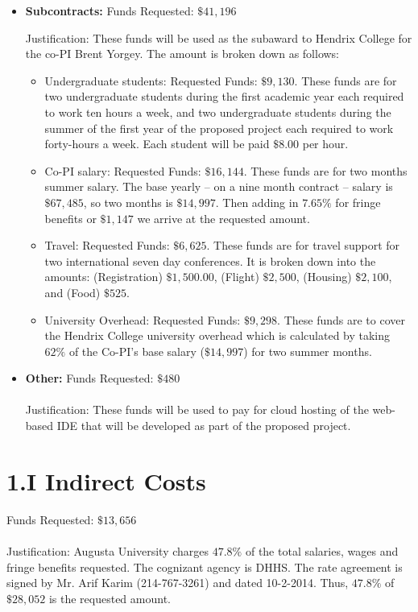 \documentclass[11pt]{article}
\begin{document}
\begin{itemize}
\item \textbf{Subcontracts:} Funds Requested: $\$41,196$

  Justification: These funds will be used as the subaward to Hendrix
  College for the co-PI Brent Yorgey.  The amount is broken down as
  follows:
  \begin{itemize}
  \item Undergraduate students: Requested Funds: $\$9,130$.  These
    funds are for two undergraduate students during the first academic
    year each required to work ten hours a week, and two undergraduate
    students during the summer of the first year of the proposed
    project each required to work forty-hours a week.  Each student
    will be paid $\$8.00$ per hour.
  \item Co-PI salary: Requested Funds: $\$16,144$.  These funds are
    for two months summer salary. The base yearly -- on a nine month
    contract -- salary is $\$67,485$, so two months is $\$14,997$.
    Then adding in $7.65\%$ for fringe benefits or $\$1,147$ we arrive
    at the requested amount.
  \item Travel: Requested Funds: $\$6,625$.  These funds are for
    travel support for two international seven day conferences. It is
    broken down into the amounts: (Registration) $\$1,500.00$,
    (Flight) $\$2,500$, (Housing) $\$2,100$, and (Food) $\$525$.
  \item University Overhead: Requested Funds: $\$9,298$.  These funds
    are to cover the Hendrix College university overhead which is
    calculated by taking $62\%$ of the Co-PI's base salary
    ($\$14,997$) for two summer months.
  \end{itemize}

\item \textbf{Other:} Funds Requested: $\$480$\\ \ \\ Justification:
  These funds will be used to pay for cloud hosting of the web-based
  IDE that will be developed as part of the proposed project.
\end{itemize}


\section*{1.I Indirect Costs}
\label{sec:1.i_indirect_costs}
Funds Requested: $\$13,656$\\ \ \\ Justification: Augusta University
charges $47.8\%$ of the total salaries, wages and fringe benefits
requested.  The cognizant agency is DHHS.  The rate agreement is
signed by Mr. Arif Karim (214-767-3261) and dated 10-2-2014.  Thus,
$47.8\%$ of $\$28,052$ is the requested amount.
\end{document}
